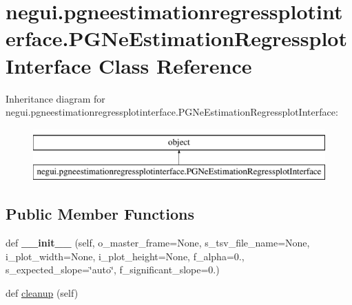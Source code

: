 \hypertarget{classnegui_1_1pgneestimationregressplotinterface_1_1PGNeEstimationRegressplotInterface}{}\section{negui.\+pgneestimationregressplotinterface.\+P\+G\+Ne\+Estimation\+Regressplot\+Interface Class Reference}
\label{classnegui_1_1pgneestimationregressplotinterface_1_1PGNeEstimationRegressplotInterface}
Inheritance diagram for negui.\+pgneestimationregressplotinterface.\+P\+G\+Ne\+Estimation\+Regressplot\+Interface\+:\begin{figure}[H]
\begin{center}
\leavevmode
\includegraphics[height=2.000000cm]{classnegui_1_1pgneestimationregressplotinterface_1_1PGNeEstimationRegressplotInterface}
\end{center}
\end{figure}
\subsection*{Public Member Functions}
\begin{DoxyCompactItemize}
\item 
def {\bfseries \+\_\+\+\_\+init\+\_\+\+\_\+} (self, o\+\_\+master\+\_\+frame=None, s\+\_\+tsv\+\_\+file\+\_\+name=None, i\+\_\+plot\+\_\+width=None, i\+\_\+plot\+\_\+height=None, f\+\_\+alpha=0., s\+\_\+expected\+\_\+slope=\char`\"{}auto\char`\"{}, f\+\_\+significant\+\_\+slope=0.)\hypertarget{classnegui_1_1pgneestimationregressplotinterface_1_1PGNeEstimationRegressplotInterface_ac429f5e57b4a7f0ae0e0b628969468b2}{}\label{classnegui_1_1pgneestimationregressplotinterface_1_1PGNeEstimationRegressplotInterface_ac429f5e57b4a7f0ae0e0b628969468b2}

\item 
def \hyperlink{classnegui_1_1pgneestimationregressplotinterface_1_1PGNeEstimationRegressplotInterface_a398187c91753d465475669b8bf2fec63}{cleanup} (self)
\end{DoxyCompactItemize}
